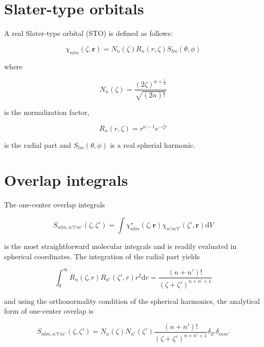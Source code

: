 \documentclass[a4paper]{article}
\newcommand{\bold}[1]{\mathbf{#1}}
\newcommand{\dd}{\mathrm{d}}
\begin{document}
\section{Slater-type orbitals}

A real Slater-type orbital (STO) is defined as follows: 

\begin{equation}
  \chi_{nlm}(\zeta, \bold{r}) = N_n(\zeta) R_n(r, \zeta) S_{lm}(\theta, \phi)
  \label{eq:real_sto}
\end{equation}

where

\begin{equation}
  N_n(\zeta) = \frac{(2\zeta)^{n+\frac{1}{2}}}{\sqrt{(2n)!}} 
  \label{eq:norm_sto}
\end{equation}

is the normalization factor,

\begin{equation}
  R_n(r,\zeta) = r^{n-1} e^{-\zeta r} 
  \label{eq:sto_radial_part}
\end{equation}

is the radial part and $S_{lm}(\theta, \phi)$ is a real spherial harmonic.

\section{Overlap integrals}

The one-center overlap integrals

\begin{equation}
  S_{nlm,n'l'm'}(\zeta, \zeta') = 
  \int \chi_{nlm}^{\star}(\zeta, \bold{r}) 
  \chi_{n'm'l'}(\zeta', \bold{r}) \dd V 
  \label{eq:1c_overlap_integral} 
\end{equation}

is the most straightforward molecular integrals and is readily evaluated in
spherical coordinates. The integration of the radial part yields

\begin{equation}
  \int_0^{\infty} R_n(\zeta,r) R_{n'}(\zeta',r) r^2 \dd r = 
  \frac{(n+n')!}{(\zeta+\zeta')^{n+n'+1}}
  \label{eq:1c_overlap_integral_radial_part_eval}
\end{equation}

and using the orthonormality condition of the spherical harmonics, the analytical
form of one-center overlap is

\begin{equation}
  S_{nlm,n'l'm'}(\zeta, \zeta') = 
  N_n(\zeta) N_{n'}(\zeta') 
  \frac{(n+n')!}{(\zeta+\zeta')^{n+n'+1}}
  \delta_{ll'}\delta_{mm'}
\label{eq:1c_overlap_integral_result}
\end{equation}
\end{document}
